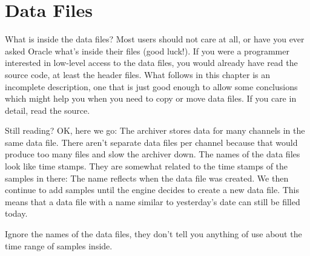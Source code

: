 \section{Data Files}

What is inside the data files? Most users should not care at all, or
have you ever asked Oracle what's inside their files (good luck!).  If
you were a programmer interested in low-level access to the data
files, you would already have read the source code, at least the
header files.  What follows in this chapter is an incomplete
description, one that is just good enough to allow some conclusions
which might help you when you need to copy or move data files.
If you care in detail, read the source.

Still reading? OK, here we go: The archiver stores data for many
channels in the same data file. There aren't separate data files per
channel because that would produce too many files and slow the archiver down.
The names of the data files look like time stamps. They are somewhat
related to the time stamps of the samples in there: The name reflects
when the data file was created. We then continue to add samples until
the engine decides to create a new data file. This means that a data
file with a name similar to yesterday's date can still be filled
today.

 Ignore the names of the data files,
they don't tell you anything of use about the time range of samples inside.

